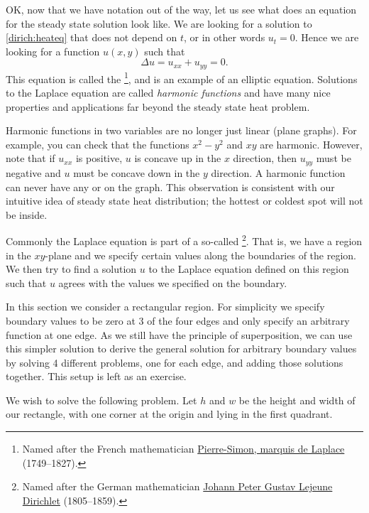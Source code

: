 OK\@, now that we have notation out of the way, let us see what does an equation
for the steady state solution look like.  We are looking for a solution to
\eqref{dirich:heateq} that does not depend on $t$, or in other words $u_t =
0$.  Hence we are looking for a
function $u(x,y)$ such that
\begin{equation*}
\boxed{~~
\Delta u = 
u_{xx} + u_{yy} = 0 .
~~}
\end{equation*}
This equation is called the \emph{}%
\footnote{Named after the French mathematician
\href{https://en.wikipedia.org/wiki/Laplace}{Pierre-Simon, marquis de Laplace}
(1749--1827).}, and is an example of an elliptic equation.
Solutions to the Laplace equation
are called \emph{harmonic functions}
and have many nice properties and
applications far beyond the steady state heat problem.

Harmonic functions in two variables are no longer just linear (plane
graphs).  For example, you can check that the functions
$x^2-y^2$ and $xy$ are harmonic.  However, note that if $u_{xx}$ is positive, $u$ is concave
up in the $x$ direction, then $u_{yy}$ must be negative and $u$ must be
concave down in the $y$ direction.  A harmonic function can never
have any  or  on the graph.  This observation is
consistent with our intuitive idea of steady state heat distribution;
the hottest or coldest spot will not be inside.

Commonly the Laplace equation is part of a so-called
\emph{}%
\footnote{Named after the German mathematician
\href{https://en.wikipedia.org/wiki/Dirichlet}{Johann Peter Gustav Lejeune Dirichlet}
(1805--1859).}.
That
is, we have a region in the $xy$-plane and we specify certain values along
the boundaries of the region.  We then try to find a solution $u$ to the
Laplace equation defined on
this region such that $u$ agrees with the values we specified on the
boundary.

In this section we consider a rectangular region.  For simplicity
we specify boundary values to be zero at 3 of the four edges and only
specify an arbitrary function at one edge.  As we still have the
principle of superposition, we can use this simpler
solution to derive the general
solution for arbitrary boundary values by solving 4 different problems,
one for each edge, and adding those solutions together.
This setup is left as an exercise.

We wish to solve the following problem.  Let $h$ and $w$
be the height and width of our rectangle, with one corner at the origin and
lying in the first quadrant.

